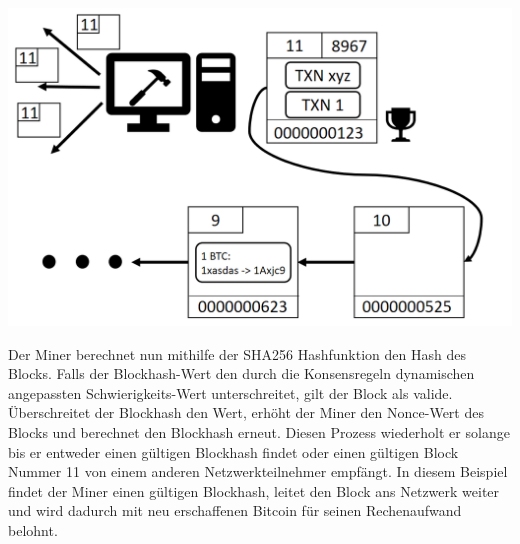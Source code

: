 \vspace{1cm}
\begin{minipage}{0.55\textwidth}
\includegraphics[width=\textwidth]{Figures/konzept_btc/konzept5}
\centering
\decoRule
{}
\label{fig:konzept5}
\end{minipage}
\begin{minipage}{0.45\textwidth}
Der Miner berechnet nun mithilfe der SHA256 Hashfunktion den Hash des Blocks. Falls der Blockhash-Wert den durch die Konsensregeln dynamischen angepassten Schwierigkeits-Wert unterschreitet, gilt der Block als valide. Überschreitet der Blockhash den Wert, erhöht der Miner den Nonce-Wert des Blocks und berechnet den Blockhash erneut. Diesen Prozess wiederholt er solange bis er entweder einen gültigen Blockhash findet oder einen gültigen Block Nummer 11 von einem anderen Netzwerkteilnehmer empfängt.
In diesem Beispiel findet der Miner einen gültigen Blockhash, leitet den Block ans Netzwerk weiter und wird dadurch mit neu erschaffenen Bitcoin für seinen Rechenaufwand belohnt.
\end{minipage}

